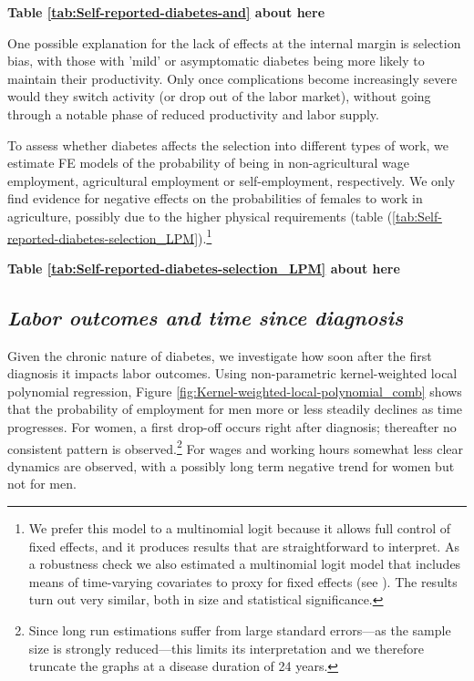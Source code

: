 \documentclass[12pt,english]{article}
\begin{document}
\begin{center}
	\textbf{Table \ref{tab:Self-reported-diabetes-and} about here}
\end{center}

One possible explanation for the lack of effects at the internal margin is selection bias, with those with 'mild' or asymptomatic diabetes being more likely to maintain their productivity. Only once complications become increasingly severe would they switch activity (or drop out of the labor market), without going through a notable phase of reduced productivity and labor supply.

To assess whether diabetes affects the selection into different types of work, we estimate \ac{FE} models of the probability of being in non-agricultural wage employment, agricultural employment or self-employment, respectively. We only find evidence for negative effects on the probabilities of females to work in agriculture, possibly due to the higher physical requirements (table (\ref{tab:Self-reported-diabetes-selection_LPM}).\footnote{We prefer this model to a multinomial logit because it allows full control of fixed effects, and it produces results that are straightforward to interpret. As a robustness check we also estimated a multinomial logit model that includes means of time-varying covariates to proxy for fixed effects (see \textcite{Mundlak1978,Bell2015}). The results turn out very similar, both in size and statistical significance.}

\begin{center}
	\textbf{Table \ref{tab:Self-reported-diabetes-selection_LPM} about here}
\end{center}

\subsection{\label{sec:duration}\textit{Labor outcomes and time since diagnosis}}

Given the chronic nature of diabetes, we investigate how soon after the first diagnosis it impacts labor outcomes. Using non-parametric kernel-weighted local polynomial regression, Figure \ref{fig:Kernel-weighted-local-polynomial_comb} shows that the probability of employment for men more or less steadily declines as time progresses. For women, a first drop-off occurs right after diagnosis; thereafter no consistent pattern is observed.\footnote{Since long run estimations suffer from large standard errors---as the sample size is strongly reduced---this limits its interpretation and we therefore truncate the graphs at a disease duration of 24 years.} For wages and working hours somewhat less clear dynamics are observed, with a possibly long term negative trend for women but not for men.
\end{document}
